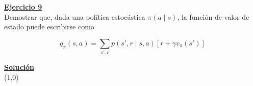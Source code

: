 \indent\underline{\textbf{Ejercicio 9}}\\
Demostrar que, dada una política estocástica $\pi (a \mid s)$, la función de valor de estado puede escribirse como

\[
    q_{\pi}(s,a) = \sum_{s',r} p(s', r \mid s, a) [r + \gamma v_{\pi}(s')]
\]

\indent\underline{\textbf{Solución}}\\

\line(1,0){\textwidth}
